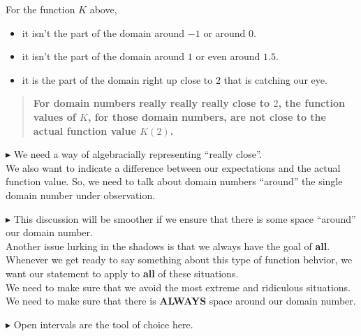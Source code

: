 \documentclass{ximera}
\begin{document}
For the function $K$ above, 

\begin{itemize}
\item it isn't the part of the domain around $-1$ or around $0$.  
\item it isn't the part of the domain around $1$ or even around $1.5$. 
\item it is the part of the domain right up close to $2$ that is catching our eye.
\end{itemize}


\begin{quote}
 \textbf{\textcolor{blue!55!black}{For domain numbers really really really close to $2$, the function values of $K$, for those domain numbers, are not close to the actual function value $K(2)$.}} \\
 
\end{quote}







\textbf{\textcolor{red!90!darkgray}{$\blacktriangleright$}} We need a way of algebracially representing ``really close''.  \\


We also want to indicate a difference between our expectations and the actual function value. So, we need to talk about domain numbers ``around'' the single domain number under observation. 


\textbf{\textcolor{red!90!darkgray}{$\blacktriangleright$}} This discussion will be smoother if we ensure that there is some space ``around'' our domain number. \\





Another issue lurking in the shadows is that we always have the goal of \textbf{\textcolor{red!80!black}{all}}. Whenever we get ready to say something about this type of function behvior, we want our statement to apply to \textbf{\textcolor{red!80!black}{all}} of these situations. \\

We need to make sure that we avoid the most extreme and ridiculous situations.  We need to make sure that there is \textbf{\textcolor{red!80!black}{ALWAYS}} space around our domain number.



\textbf{\textcolor{red!90!darkgray}{$\blacktriangleright$}} Open intervals are the tool of choice here.
\end{document}
